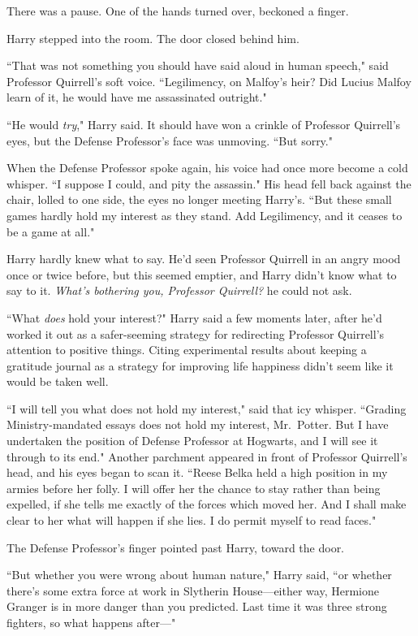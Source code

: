 There was a pause. One of the hands turned over, beckoned a finger.

Harry stepped into the room. The door closed behind him.

``That was not something you should have said aloud in human speech," said Professor Quirrell's soft voice. ``Legilimency, on Malfoy's heir? Did Lucius Malfoy learn of it, he would have me assassinated outright."

``He would \emph{try}," Harry said. It should have won a crinkle of Professor Quirrell's eyes, but the Defense Professor's face was unmoving. ``But sorry."

When the Defense Professor spoke again, his voice had once more become a cold whisper. ``I suppose I could, and pity the assassin." His head fell back against the chair, lolled to one side, the eyes no longer meeting Harry's. ``But these small games hardly hold my interest as they stand. Add Legilimency, and it ceases to be a game at all."

Harry hardly knew what to say. He'd seen Professor Quirrell in an angry mood once or twice before, but this seemed emptier, and Harry didn't know what to say to it. \emph{What's bothering you, Professor Quirrell?} he could not ask.

``What \emph{does} hold your interest?" Harry said a few moments later, after he'd worked it out as a safer-seeming strategy for redirecting Professor Quirrell's attention to positive things. Citing experimental results about keeping a gratitude journal as a strategy for improving life happiness didn't seem like it would be taken well.

``I will tell you what does not hold my interest," said that icy whisper. ``Grading Ministry-mandated essays does not hold my interest, Mr.~Potter. But I have undertaken the position of Defense Professor at Hogwarts, and I will see it through to its end." Another parchment appeared in front of Professor Quirrell's head, and his eyes began to scan it. ``Reese Belka held a high position in my armies before her folly. I will offer her the chance to stay rather than being expelled, if she tells me exactly of the forces which moved her. And I shall make clear to her what will happen if she lies. I do permit myself to read faces."

The Defense Professor's finger pointed past Harry, toward the door.

``But whether you were wrong about human nature," Harry said, ``or whether there's some extra force at work in Slytherin House—either way, Hermione Granger is in more danger than you predicted. Last time it was three strong fighters, so what happens after—"

